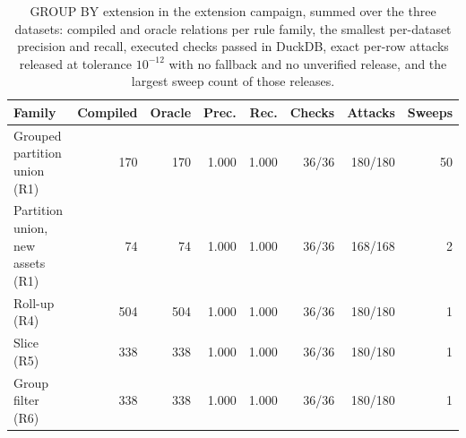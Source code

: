 \begin{table}[h]
\centering
\caption{GROUP BY extension in the extension campaign, summed over the three datasets: compiled and oracle relations per rule family, the smallest per-dataset precision and recall, executed checks passed in DuckDB, exact per-row attacks released at tolerance $10^{-12}$ with no fallback and no unverified release, and the largest sweep count of those releases.}
\label{tab:ext-groupby}
\footnotesize
\setlength{\tabcolsep}{3pt}
\begin{tabular}{@{}lrrrrrrr@{}}
\toprule
Family & Compiled & Oracle & Prec. & Rec. & Checks & Attacks & Sweeps \\
\midrule
Grouped partition union (R1) & 170 & 170 & 1.000 & 1.000 & 36/36 & 180/180 & 50 \\
Partition union, new assets (R1) & 74 & 74 & 1.000 & 1.000 & 36/36 & 168/168 & 2 \\
Roll-up (R4) & 504 & 504 & 1.000 & 1.000 & 36/36 & 180/180 & 1 \\
Slice (R5) & 338 & 338 & 1.000 & 1.000 & 36/36 & 180/180 & 1 \\
Group filter (R6) & 338 & 338 & 1.000 & 1.000 & 36/36 & 180/180 & 1 \\
\bottomrule
\end{tabular}
\end{table}
